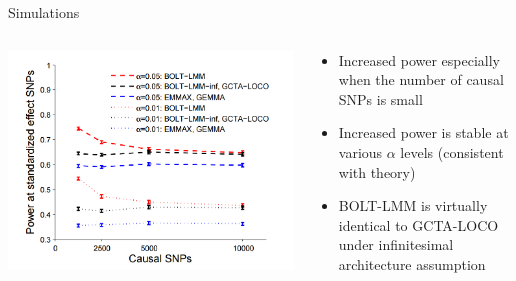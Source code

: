 \documentclass[aspectratio=169]{beamer}\usepackage[]{graphicx}\usepackage[]{color}
\begin{document}
\begin{frame}{Simulations}
\begin{columns}[onlytextwidth]
\begin{column}{0.6\textwidth}
\includegraphics[scale=.3]{./figure/PowerCurves.png}
\end{column}
\begin{column}{0.4\textwidth}
\begin{itemize}
\item Increased power especially when the number of causal SNPs is small
\item Increased power is stable at various $\alpha$ levels (consistent with theory)
\item BOLT-LMM is virtually identical to GCTA-LOCO under infinitesimal architecture assumption
\end{itemize}
\end{column}
\end{columns}
\end{frame}
\end{document}
